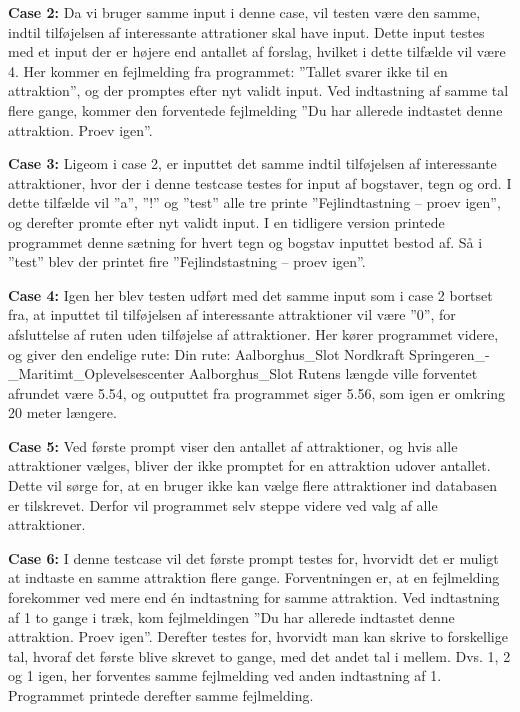 \textbf{Case 2:} \newline
Da vi bruger samme input i denne case, vil testen være den samme, indtil tilføjelsen af interessante attrationer skal have input. Dette input testes med et input der er højere end antallet af forslag, hvilket i dette tilfælde vil være 4. Her kommer en fejlmelding fra programmet: ”Tallet svarer ikke til en attraktion”, og der promptes efter nyt validt input. Ved indtastning af samme tal flere gange, kommer den forventede fejlmelding ”Du har allerede indtastet denne attraktion. Proev igen”.

\textbf{Case 3:} \newline
Ligeom i case 2, er inputtet det samme indtil tilføjelsen af interessante attraktioner, hvor der i denne testcase testes for input af bogstaver, tegn og ord. I dette tilfælde vil ”a”, ”!” og ”test” alle tre printe ”Fejlindtastning – proev igen”, og derefter promte efter nyt validt input. I en tidligere version printede programmet denne sætning for hvert tegn og bogstav inputtet bestod af. Så i ”test” blev der printet fire ”Fejlindstastning – proev igen”. 

\textbf{Case 4:} \newline
Igen her blev testen udført med det samme input som i case 2 bortset fra, at inputtet til tilføjelsen af interessante attraktioner vil være ”0”, for afsluttelse af ruten uden tilføjelse af attraktioner. Her kører programmet videre, og giver den endelige rute: \newline
Din rute:\newline
Aalborghus\_Slot\newline
Nordkraft\newline
Springeren\_-\_Maritimt\_Oplevelsescenter\newline
Aalborghus\_Slot\newline
Rutens længde ville forventet afrundet være 5.54, og outputtet fra programmet siger 5.56, som igen er omkring 20 meter længere.

\textbf{Case 5:} \newline
Ved første prompt viser den antallet af attraktioner, og hvis alle attraktioner vælges, bliver der ikke promptet for en attraktion udover antallet. Dette vil sørge for, at en bruger ikke kan vælge flere attraktioner ind databasen er tilskrevet. Derfor vil programmet selv steppe videre ved valg af alle attraktioner.

\textbf{Case 6:} \newline
I denne testcase vil det første prompt testes for, hvorvidt det er muligt at indtaste en samme attraktion flere gange. Forventningen er, at en fejlmelding forekommer ved mere end én indtastning for samme attraktion. Ved indtastning af 1 to gange i træk, kom fejlmeldingen ”Du har allerede indtastet denne attraktion. Proev igen”. Derefter testes for, hvorvidt man kan skrive to forskellige tal, hvoraf det første blive skrevet to gange, med det andet tal i mellem. Dvs. 1, 2 og 1 igen, her forventes samme fejlmelding ved anden indtastning af 1. Programmet printede derefter samme fejlmelding.

